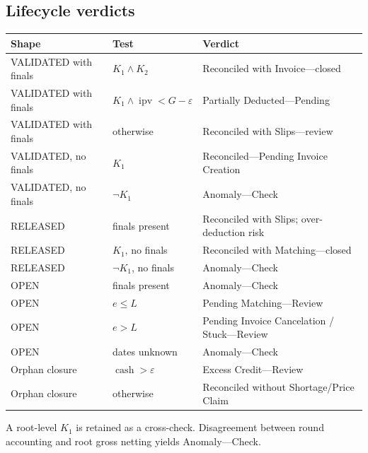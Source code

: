\documentclass[11pt,a4paper]{article}
\newcommand{\eps}{\varepsilon}
\newcommand{\cash}{\operatorname{cash}}
\theoremstyle{definition}
\begin{document}
\subsection{Lifecycle verdicts}
\begin{longtable}{@{}p{}p{}p{}@{}}
\toprule
\textbf{Shape} & \textbf{Test} & \textbf{Verdict}\\
\midrule
\endhead
VALIDATED with finals & $K_1\wedge K_2$ & Reconciled with Invoice---closed\\
VALIDATED with finals & $K_1\wedge\operatorname{ipv}<G-\eps$ & Partially Deducted---Pending\\
VALIDATED with finals & otherwise & Reconciled with Slips---review\\
VALIDATED, no finals & $K_1$ & Reconciled---Pending Invoice Creation\\
VALIDATED, no finals & $\neg K_1$ & Anomaly---Check\\
RELEASED & finals present & Reconciled with Slips; over-deduction risk\\
RELEASED & $K_1$, no finals & Reconciled with Matching---closed\\
RELEASED & $\neg K_1$, no finals & Anomaly---Check\\
OPEN & finals present & Anomaly---Check\\
OPEN & $e\le L$ & Pending Matching---Review\\
OPEN & $e>L$ & Pending Invoice Cancelation / Stuck---Review\\
OPEN & dates unknown & Anomaly---Check\\
Orphan closure & $\cash>\eps$ & Excess Credit---Review\\
Orphan closure & otherwise & Reconciled without Shortage/Price Claim\\
\bottomrule
\end{longtable}
A root-level $K_1$ is retained as a cross-check. Disagreement between
round accounting and root gross netting yields Anomaly---Check.
\end{document}

